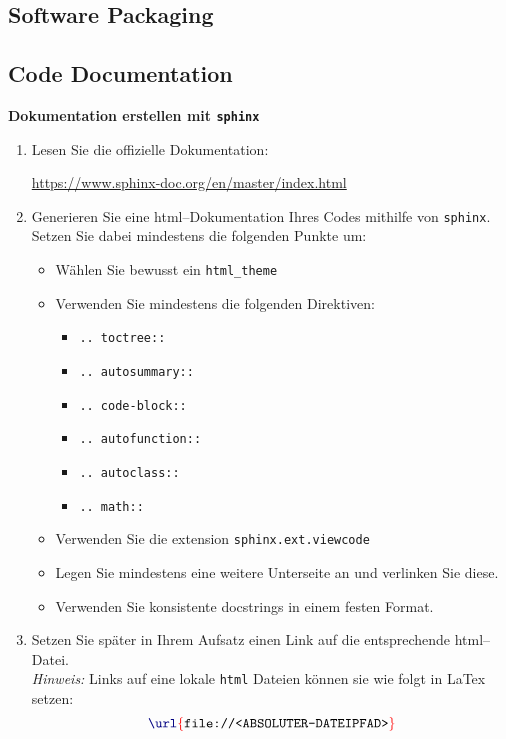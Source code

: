 \subsection{Software Packaging}

\subsection{Code Documentation}


\textbf{Dokumentation erstellen mit \texttt{sphinx}}\\

\begin{enumerate}
	\item Lesen Sie die offizielle	Dokumentation:

	      \url{https://www.sphinx-doc.org/en/master/index.html}

	\item Generieren Sie eine html--Dokumentation Ihres Codes mithilfe von \texttt{sphinx}. Setzen Sie dabei mindestens die folgenden Punkte um:
	      \begin{itemize}
		      \item Wählen Sie bewusst ein \texttt{html\_theme}
		      \item Verwenden Sie mindestens die folgenden Direktiven:
		            \begin{itemize}
			            \item \texttt{.. toctree::}
			            \item \texttt{.. autosummary::}
			            \item \texttt{.. code-block::}
			            \item \texttt{.. autofunction::}
			            \item \texttt{.. autoclass::}
			            \item \texttt{.. math::}
		            \end{itemize}
		      \item Verwenden Sie die extension \texttt{sphinx.ext.viewcode}
		      \item Legen Sie mindestens eine weitere Unterseite an und verlinken Sie diese.
		      \item Verwenden Sie konsistente docstrings in einem festen Format.
	      \end{itemize}
	\item Setzen Sie später in Ihrem Aufsatz einen Link auf die entsprechende html--Datei. \\
	      \textit{Hinweis:} Links auf eine lokale \texttt{html} Dateien können sie wie folgt in LaTex setzen: $$\latexCommand{url}{file://<ABSOLUTER-DATEIPFAD>}$$
\end{enumerate}


